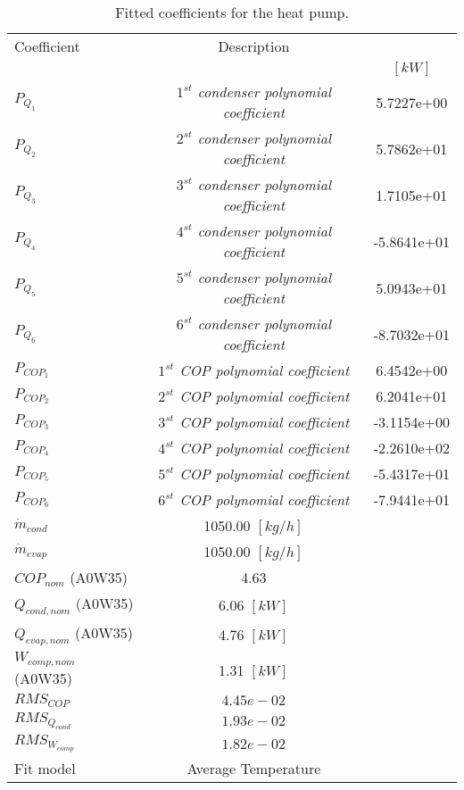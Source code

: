 \documentclass[english]{SPFShortReport}
\author{Dani Carbonell}
\begin{document}
\begin{table}[!ht]
\begin{small}
\caption{Fitted coefficients for the heat pump.}
\begin{center}
\resizebox{12cm}{!} 
{
\begin{tabular}{l | c c } 
\hline
\hline
Coefficient &Description & \\ 
 & &$[kW]$\\ 
\hline
$P_{Q_{1}}$ & \emph{$1^{st}$ condenser polynomial coefficient}  & 5.7227e+00    \\ 
$P_{Q_{2}}$ & \emph{$2^{st}$ condenser polynomial coefficient}  & 5.7862e+01    \\ 
$P_{Q_{3}}$ & \emph{$3^{st}$ condenser polynomial coefficient}  & 1.7105e+01    \\ 
$P_{Q_{4}}$ & \emph{$4^{st}$ condenser polynomial coefficient}  & -5.8641e+01    \\ 
$P_{Q_{5}}$ & \emph{$5^{st}$ condenser polynomial coefficient}  & 5.0943e+01    \\ 
$P_{Q_{6}}$ & \emph{$6^{st}$ condenser polynomial coefficient}  & -8.7032e+01    \\ 
\hline
$P_{COP_{1}}$ & \emph{$1^{st}$ COP polynomial coefficient}  & 6.4542e+00    \\ 
$P_{COP_{2}}$ & \emph{$2^{st}$ COP polynomial coefficient}  & 6.2041e+01    \\ 
$P_{COP_{3}}$ & \emph{$3^{st}$ COP polynomial coefficient}  & -3.1154e+00    \\ 
$P_{COP_{4}}$ & \emph{$4^{st}$ COP polynomial coefficient}  & -2.2610e+02    \\ 
$P_{COP_{5}}$ & \emph{$5^{st}$ COP polynomial coefficient}  & -5.4317e+01    \\ 
$P_{COP_{6}}$ & \emph{$6^{st}$ COP polynomial coefficient}  & -7.9441e+01    \\ 
\hline
$\dot m_{cond}$ & 1050.00 $[kg/h]$ \\ 
$\dot m_{evap}$ & 1050.00 $[kg/h]$ \\ 
\hline
$COP_{nom}$ (A0W35)& 4.63 \\ 
$Q_{cond,nom}$ (A0W35)& 6.06 $[kW]$\\ 
$Q_{evap,nom}$ (A0W35)& 4.76 $[kW]$\\ 
$W_{comp,nom}$ (A0W35)& 1.31 $[kW]$\\ 
\hline
 $RMS_{COP}$ & $4.45e-02$ \\ 
 $RMS_{Q_{cond}}$ & $1.93e-02$ \\ 
 $RMS_{W_{comp}}$ & $1.82e-02$ \\ 
\hline
Fit model & Average Temperature\\ 
\hline
\hline
\end{tabular}
}
\label{CoefTable}
\end{center}
\end{small}
\end{table}
\end{document}
